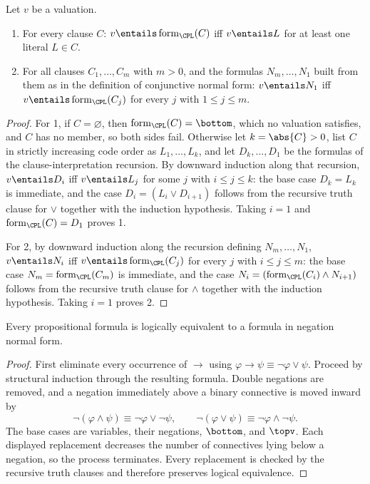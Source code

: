 \begin{lemma}
\label{lem:prop-clause-satisfaction}
Let \(v\) be a valuation.
\begin{enumerate}
  \item For every clause \(C\):
        \(v\entails\operatorname{form}_{\CPL}(C)\) iff
        \(v\entails L\) for at least one literal \(L\in C\).
  \item For all clauses \(C_1,\ldots,C_m\) with \(m>0\), and the formulas
        \(N_m,\ldots,N_1\) built from them as in the definition of
        conjunctive normal form: \(v\entails N_1\) iff
        \(v\entails\operatorname{form}_{\CPL}(C_j)\) for every \(j\) with
        \(1\leq j\leq m\).
\end{enumerate}
\end{lemma}
\begin{proof}
For 1, if \(C=\varnothing\), then
\(\operatorname{form}_{\CPL}(C)=\bottom\), which no valuation satisfies,
and \(C\) has no member, so both sides fail.  Otherwise let
\(k=\abs{C}>0\), list \(C\) in strictly increasing code order as
\(L_1,\ldots,L_k\), and let \(D_k,\ldots,D_1\) be the formulas of the
clause-interpretation recursion.  By downward induction along that
recursion, \(v\entails D_i\) iff \(v\entails L_j\) for some \(j\) with
\(i\leq j\leq k\): the base case \(D_k=L_k\) is immediate, and the case
\(D_i=(L_i\lor D_{i+1})\) follows from the recursive truth clause for
\(\lor\) together with the induction hypothesis.  Taking \(i=1\) and
\(\operatorname{form}_{\CPL}(C)=D_1\) proves 1.

For 2, by downward induction along the recursion defining
\(N_m,\ldots,N_1\), \(v\entails N_i\) iff
\(v\entails\operatorname{form}_{\CPL}(C_j)\) for every \(j\) with
\(i\leq j\leq m\): the base case \(N_m=\operatorname{form}_{\CPL}(C_m)\)
is immediate, and the case
\(N_i=(\operatorname{form}_{\CPL}(C_i)\land N_{i+1})\) follows from the
recursive truth clause for \(\land\) together with the induction
hypothesis.  Taking \(i=1\) proves 2.
\end{proof}

\begin{theorem}
Every propositional formula is logically equivalent to a formula in negation
normal form.
\end{theorem}
\begin{proof}
First eliminate every occurrence of \(\to\) using
\(\varphi\to\psi\equiv\neg\varphi\lor\psi\).  Proceed by structural
induction through the resulting formula.  Double negations are removed, and a
negation immediately above a binary connective is moved inward by
\[
 \neg(\varphi\land\psi)\equiv\neg\varphi\lor\neg\psi,
 \qquad
 \neg(\varphi\lor\psi)\equiv\neg\varphi\land\neg\psi.
\]
The base cases are variables, their negations, \(\bottom\), and \(\topv\).
Each displayed replacement decreases the number of connectives lying below a
negation, so the process terminates.  Every replacement is checked by the
recursive truth clauses and therefore preserves logical equivalence.
\end{proof}

